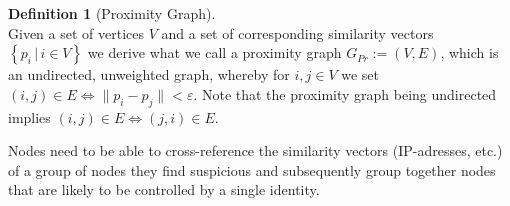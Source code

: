 \documentclass[11pt,a4paper]{report}
\theoremstyle{definition}
\newtheorem{definition}{Definition}[section]
\theoremstyle{theorem}
\theoremstyle{proposition}
\theoremstyle{corollary}
\theoremstyle{lemma}
\theoremstyle{example}
\theoremstyle{remark}
\begin{document}
\begin{definition}[Proximity Graph]\ \\
Given a set of vertices $V$ and a set of corresponding similarity vectors $\left\lbrace{}p_i\,|\,i\in{}V\right\rbrace$ we derive what we call a proximity graph $G_{Pr}:=(V,E)$, which is an undirected, unweighted graph, whereby for $i,j\in{}V$ we set $(i,j)\in{}E\Leftrightarrow\|p_i-p_j\|<\varepsilon$. Note that the proximity graph being undirected implies $(i,j)\in{}E\Leftrightarrow(j,i)\in{}E$.
\end{definition}

\noindent{}Nodes need to be able to cross-reference the similarity vectors (IP-adresses, etc.) of a group of nodes they find suspicious and subsequently group together nodes that are likely to be controlled by a single identity. 
\end{document}
